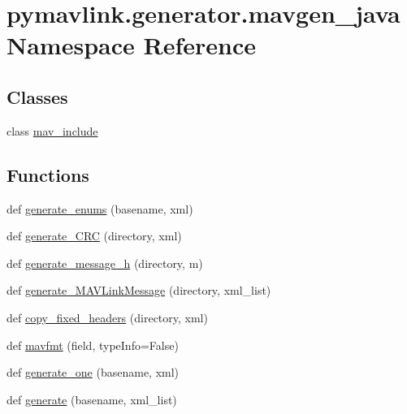 \hypertarget{namespacepymavlink_1_1generator_1_1mavgen__java}{}\section{pymavlink.\+generator.\+mavgen\+\_\+java Namespace Reference}
\label{namespacepymavlink_1_1generator_1_1mavgen__java}
\subsection*{Classes}
\begin{DoxyCompactItemize}
\item 
class \mbox{\hyperlink{classpymavlink_1_1generator_1_1mavgen__java_1_1mav__include}{mav\+\_\+include}}
\end{DoxyCompactItemize}
\subsection*{Functions}
\begin{DoxyCompactItemize}
\item 
def \mbox{\hyperlink{namespacepymavlink_1_1generator_1_1mavgen__java_a28c5498b088ff49d4396c50a899e12e5}{generate\+\_\+enums}} (basename, xml)
\item 
def \mbox{\hyperlink{namespacepymavlink_1_1generator_1_1mavgen__java_a813b049b70acedf90a39e62dd608bad7}{generate\+\_\+\+C\+RC}} (directory, xml)
\item 
def \mbox{\hyperlink{namespacepymavlink_1_1generator_1_1mavgen__java_a724ccefca61f69197f6cdfde059d7274}{generate\+\_\+message\+\_\+h}} (directory, m)
\item 
def \mbox{\hyperlink{namespacepymavlink_1_1generator_1_1mavgen__java_a02449b086b78cf9462077c13ba63a2f0}{generate\+\_\+\+M\+A\+V\+Link\+Message}} (directory, xml\+\_\+list)
\item 
def \mbox{\hyperlink{namespacepymavlink_1_1generator_1_1mavgen__java_ab7e11242a8e14499326d0ab7de04d9d1}{copy\+\_\+fixed\+\_\+headers}} (directory, xml)
\item 
def \mbox{\hyperlink{namespacepymavlink_1_1generator_1_1mavgen__java_a23f35fe059a4de4d3ebbd2e148f86931}{mavfmt}} (field, type\+Info=False)
\item 
def \mbox{\hyperlink{namespacepymavlink_1_1generator_1_1mavgen__java_a73c50060fdb0745de2d34d37c3b5c22c}{generate\+\_\+one}} (basename, xml)
\item 
def \mbox{\hyperlink{namespacepymavlink_1_1generator_1_1mavgen__java_a1c6932c354d39a0d5ce72d1d905a73ae}{generate}} (basename, xml\+\_\+list)
\end{DoxyCompactItemize}
